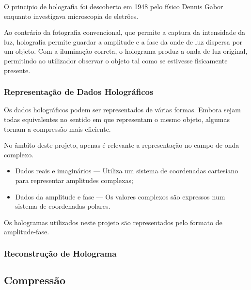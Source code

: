 O principio de holografia foi descoberto em 1948 pelo físico Dennis Gabor enquanto investigava microscopia de eletrões.

Ao contrário da fotografia convencional, que permite a captura da intensidade da luz, holografia permite guardar a amplitude e a fase da onde de luz dispersa por um objeto. Com a iluminação correta, o holograma produz a onda de luz original, permitindo ao utilizador observar o objeto tal como se estivesse fisicamente presente.



\subsubsection{Representação de Dados Holográficos}
\label{chap2:ssubsec:representacao-dados} 

Os dados holográficos podem ser representados de várias formas. Embora sejam todas equivalentes no sentido em que representam o mesmo objeto, algumas tornam a compressão mais eficiente. 


No âmbito deste projeto, apenas é relevante a representação no campo de onda complexo.


\begin{itemize}
    \item Dados reais e imaginários --- Utiliza um sistema de coordenadas cartesiano para representar amplitudes complexas;
    \item Dados da amplitude e fase --- Os valores complexos são expressos num sistema de coordenadas polares.
\end{itemize}

Os hologramas utilizados neste projeto são representados pelo formato de amplitude-fase.


\subsubsection{Reconstrução de Holograma}
\label{chap2:ssubsec:reconst-holograma}



\subsection{Compressão}
\label{chap2:subsec:compressao}

